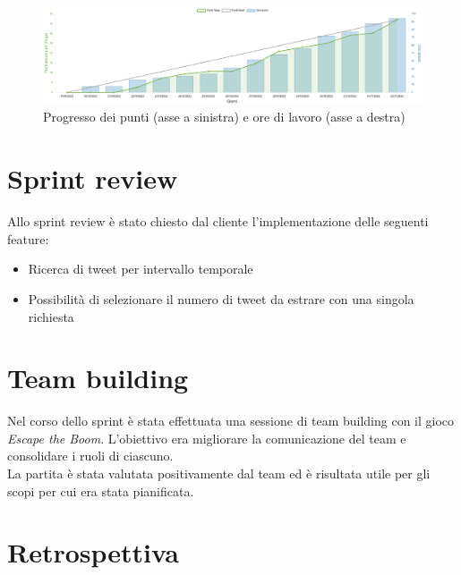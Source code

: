 \documentclass[11pt]{article}
\begin{document}
\begin{figure}[H]
    \centering
    \includegraphics[width=\textwidth]{./img/worktime.png}
    \caption{Progresso dei punti (asse a sinistra) e ore di lavoro (asse a destra)}
\end{figure}

\section*{Sprint review}
Allo sprint review è stato chiesto dal cliente l'implementazione delle seguenti feature:
\begin{itemize}
    \item Ricerca di tweet per intervallo temporale
    \item Possibilità di selezionare il numero di tweet da estrare con una singola richiesta
\end{itemize}


\newpage
\section*{Team building}
Nel corso dello sprint è stata effettuata una sessione di team building con il gioco \textit{Escape the Boom}.
L'obiettivo era migliorare la comunicazione del team e consolidare i ruoli di ciascuno.\\
La partita è stata valutata positivamente dal team ed è risultata utile per gli scopi per cui era stata pianificata.


\section*{Retrospettiva}
\end{document}
